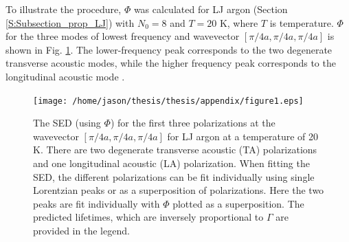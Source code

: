 To illustrate the procedure, $\Phi$ was calculated for LJ argon (Section 
\ref{S:Subsection_prop_LJ}) with $N_0=8$ and $T=20$ K, where $T$ is 
temperature. 
$\Phi$ for the three modes of lowest frequency and wavevector 
$[\pi/4a,\pi/4a,\pi/4a]$ 
is shown in Fig$.$ \ref{F:LJ_FIT_PEAK}. The lower-frequency peak 
corresponds to the two 
degenerate transverse acoustic modes, while the higher frequency peak 
corresponds to the 
longitudinal acoustic mode \cite{dove_introduction_1993}.

\vspace*{0mm}
\begin{figure}
\begin{center}
\texttt{[image: /home/jason/thesis/thesis/appendix/figure1.eps]}
\end{center}
\caption{\label{F:LJ_FIT_PEAK} The SED (using $\Phi$) for the first three 
polarizations at 
the wavevector $[\pi/4a,\pi/4a,\pi/4a]$ for LJ argon at a temperature of 
20 K. There are 
two degenerate transverse acoustic (TA) polarizations and one longitudinal 
acoustic (LA) 
polarization. When fitting the SED, the different polarizations can be fit 
individually 
using single Lorentzian peaks or as a superposition of polarizations. Here 
the two peaks 
are fit individually with $\Phi$ plotted as a superposition. The predicted 
lifetimes, 
which are inversely proportional to $\Gamma$ are provided in the legend.}
\end{figure}

